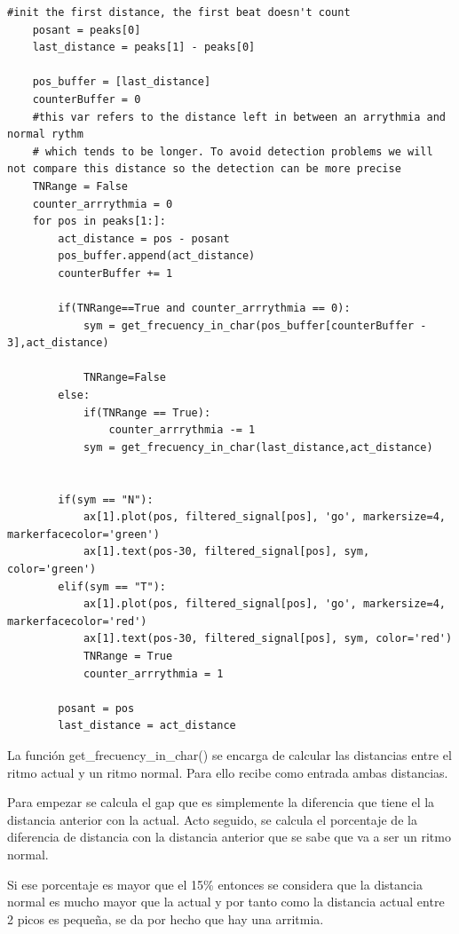 \lstset{language=python, breaklines=true, basicstyle=\footnotesize}
\begin{lstlisting}[frame=single]
    #init the first distance, the first beat doesn't count
    posant = peaks[0]
    last_distance = peaks[1] - peaks[0]

    pos_buffer = [last_distance]
    counterBuffer = 0
    #this var refers to the distance left in between an arrythmia and normal rythm 
    # which tends to be longer. To avoid detection problems we will not compare this distance so the detection can be more precise
    TNRange = False
    counter_arrrythmia = 0
    for pos in peaks[1:]:
        act_distance = pos - posant
        pos_buffer.append(act_distance)
        counterBuffer += 1
    
        if(TNRange==True and counter_arrrythmia == 0):
            sym = get_frecuency_in_char(pos_buffer[counterBuffer - 3],act_distance)
    
            TNRange=False
        else:
            if(TNRange == True):
                counter_arrrythmia -= 1
            sym = get_frecuency_in_char(last_distance,act_distance)
        
    
        if(sym == "N"):
            ax[1].plot(pos, filtered_signal[pos], 'go', markersize=4, markerfacecolor='green')
            ax[1].text(pos-30, filtered_signal[pos], sym, color='green')       
        elif(sym == "T"):
            ax[1].plot(pos, filtered_signal[pos], 'go', markersize=4, markerfacecolor='red')
            ax[1].text(pos-30, filtered_signal[pos], sym, color='red')
            TNRange = True
            counter_arrrythmia = 1
        
        posant = pos
        last_distance = act_distance
\end{lstlisting}

La función get\_frecuency\_in\_char() se encarga de calcular las distancias entre el ritmo actual y un ritmo normal. 
Para ello recibe como entrada ambas distancias.

Para empezar se calcula el gap que es simplemente la diferencia que tiene el la distancia anterior con la actual.
Acto seguido, se calcula el porcentaje de la diferencia de distancia con la distancia anterior que se sabe que va a ser 
un ritmo normal.

Si ese porcentaje es mayor que el 15\% entonces se considera que la distancia normal es mucho mayor que la actual
y por tanto como la distancia actual entre 2 picos es pequeña, se da por hecho que hay una arritmia.


